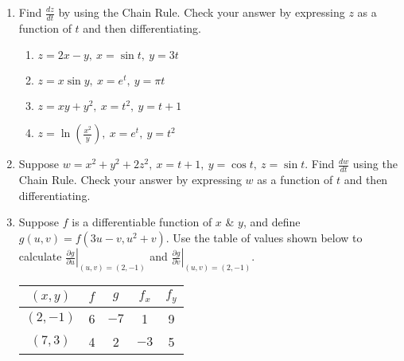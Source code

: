 \documentclass[12pt]{article}
\newif\ifans
\begin{document}
\begin{enumerate}

\item Find $\frac{d z}{d t}$ by using the Chain Rule.  Check your answer by expressing $z$ as a function of $t$ and then differentiating. 
 
\begin{enumerate}

\item $z=2x-y,\ x=\sin{t},\ y=3t$ 

\ifans{\fbox{$\frac{dz}{dt}=2\cos{t}-3$}} \fi

\item $z=x\sin{y},\ x=e^t,\ y=\pi t$ 

\ifans{\fbox{$\frac{dz}{dt}=e^{t}\sin{(\pi t)}+\pi e^{t}\cos{(\pi t)}$}} \fi

\item $z=xy+y^2,\ x=t^2,\ y=t+1$ 

\ifans{\fbox{$\frac{dz}{dt}=3t^2+4t+2$}} \fi

\item $z=\ln{\left(\frac{x^2}{y}\right)},\ x=e^{t},\ y=t^2$ 

\ifans{\fbox{$\frac{dz}{dt}=2-\frac{2}{t}$}} \fi

\end{enumerate}

\item  Suppose $w=x^2+y^2+2z^2,\ x=t+1,\ y=\cos{t},\ z=\sin{t}$.   Find $\frac{d w}{d t}$ using the Chain Rule.  Check your answer by expressing $w$ as a function of $t$ and then differentiating.

\ifans{\fbox{$\frac{dw}{dt}=2t+2+2\sin{t}\cos{t}$; ; Detailed Solution: \textcolor{blue}{\href{http://www.math.drexel.edu/classes/Calculus/resources/Math200HW/Solutions/11_200_Chain_02.pdf}{Here}} }} \fi

\item Suppose $f$ is a differentiable function of $x$ \& $y$, and define $g(u,v)=f(3u-v,u^2+v)$.  Use the table of values shown below to calculate $\left.\frac{\partial g}{\partial u}\right|_{(u,v)=(2,-1)}$ and $\left.\frac{\partial g}{\partial v}\right|_{(u,v)=(2,-1)}$.

\begin{center}
\begin{tabular}{|c|c|c|c|c|}
\hline
$(x,y)$& $f$ & $g$ & $f_x$ & $f_y$\\
\hline
$(2,-1)$ & 6 & $-7$ & 1 & 9\\
\hline
$(7,3)$ & 4 & 2 & $-3$ & 5\\
\hline
\end{tabular}
\end{center}


\end{enumerate}
\end{document}
